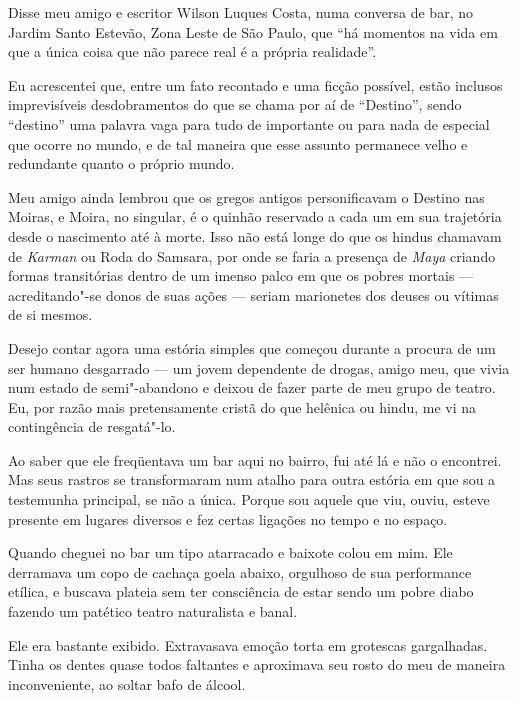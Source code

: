  

Disse meu amigo e escritor Wilson Luques Costa, numa conversa de bar, no
Jardim Santo Estevão, Zona Leste de São Paulo, que ``há momentos na vida
em que a única coisa que não parece real é a própria realidade''.

Eu acrescentei que, entre um fato recontado e uma ficção possível, estão
inclusos imprevisíveis desdobramentos do que se chama por aí de
``Destino'', sendo ``destino'' uma palavra vaga para tudo de importante
ou para nada de especial que ocorre no mundo, e de tal maneira que esse
assunto permanece velho e redundante quanto o próprio mundo.

Meu amigo ainda lembrou que os gregos antigos personificavam o Destino
nas Moiras, e Moira, no singular, é o quinhão reservado a cada um em sua
trajetória desde o nascimento até à morte. Isso não está longe do que os
hindus chamavam de \emph{Karman} ou Roda do Samsara, por onde se faria a
presença de \emph{Maya} criando formas transitórias dentro de um imenso
palco em que os pobres mortais --- acreditando"-se donos de suas ações
--- seriam marionetes dos deuses ou vítimas de si mesmos.

\asterisc{}

Desejo contar agora uma estória simples que começou durante a procura de
um ser humano desgarrado --- um jovem dependente de drogas, amigo meu,
que vivia num estado de semi"-abandono e deixou de fazer parte de meu
grupo de teatro. Eu, por razão mais pretensamente cristã do que helênica
ou hindu, me vi na contingência de resgatá"-lo.

Ao saber que ele freqüentava um bar aqui no bairro, fui até lá e não o
encontrei. Mas seus rastros se transformaram num atalho para outra
estória em que sou a testemunha principal, se não a única. Porque sou
aquele que viu, ouviu, esteve presente em lugares diversos e fez certas
ligações no tempo e no espaço.

\asterisc{}

Quando cheguei no bar um tipo atarracado e baixote colou em mim. Ele
derramava um copo de cachaça goela abaixo, orgulhoso de sua performance
etílica, e buscava plateia sem ter consciência de estar sendo um pobre
diabo fazendo um patético teatro naturalista e banal.

Ele era bastante exibido. Extravasava emoção torta em grotescas
gargalhadas. Tinha os dentes quase todos faltantes e aproximava seu
rosto do meu de maneira inconveniente, ao soltar bafo de álcool.

